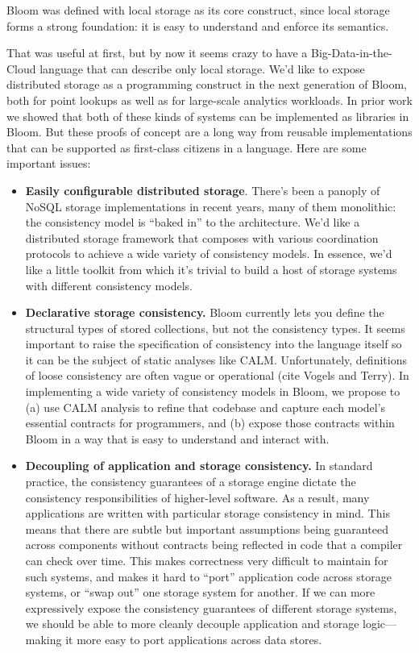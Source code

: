 Bloom was defined with local storage as its core construct, since local storage forms a strong foundation: it is easy to understand and enforce its semantics.  

That was useful at first, but by now it seems crazy to have a Big-Data-in-the-Cloud language that can describe only local storage.  We'd like to expose distributed storage as a programming construct in the next generation of Bloom, both for point lookups as well as for large-scale analytics workloads.  In prior work we showed that both of these kinds of systems can be implemented as libraries in Bloom.  But these proofs of concept are a long way from reusable implementations that can be supported as first-class citizens in a language.    Here are some important issues:
\begin{itemize}
\item \textbf{Easily configurable distributed storage}.  There's been a panoply of NoSQL storage implementations in recent years, many of them monolithic: the consistency model is ``baked in'' to the architecture.  We'd like a distributed storage framework that composes with various coordination protocols to achieve a wide variety of consistency models.  In essence, we'd like a little toolkit from which it's trivial to build a host of storage systems with different consistency models.  
\item \textbf{Declarative storage consistency.}  Bloom currently lets you define the structural types of stored collections, but not the consistency types.  It seems important to raise the specification of consistency into the language itself so it can be the subject of static analyses like CALM.  Unfortunately, definitions of loose consistency are often vague or operational (cite Vogels and Terry).  In implementing a wide variety of consistency models in Bloom, we propose to (a) use CALM analysis to refine that codebase and capture each model's essential contracts for programmers, and (b) expose those contracts within Bloom in a way that is easy to understand and interact with.
\item \textbf{Decoupling of application and storage consistency.}  In standard practice, the consistency guarantees of a storage engine dictate the consistency responsibilities of higher-level software.  As a result, many applications are written with particular storage consistency in mind.  This means that there are subtle but important assumptions being guaranteed across components without contracts being reflected in code that a compiler can check over time.  This makes correctness very difficult to maintain for such systems, and makes it hard to ``port'' application code across storage systems, or ``swap out'' one storage system for another.  If we can more expressively expose the consistency guarantees of different storage systems, we should be able to more cleanly decouple application and storage logic---making it more easy to port applications across data stores.  
\end{itemize}

